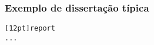 \begin{frame}
  \frametitle{Exemplo de dissertação típica}

  \begin{exemplo}
%    
%    
%    
%    
%    
%    
    \texttt{\blue{\string\documentclass}[12pt]\ac{}report\fc{}\\[1mm]
      ...\ \\[1mm]
      \\[1mm]
        \ \ \ \green{\string}\\[1mm]
        \ \ \ \green{\string}\\[1mm]
        \ \ \ \blue{\string\tableofcontents}\\[1mm]
        \ \ \ \green{\string}
        \ \ \ \ \ \ \ \ \ \ \\[1mm]
        \ \ \ \green{\string}
        \ \ \ \ \ \ \ \ \ \\[1mm]
        \ \ \ \green{\string}
        \ \ \ \ \ \\[1mm]
        \ \ \ \blue{\string}\\[1mm]
        \ \ \ \blue{\string}\\[1mm]
        }
  \end{exemplo}

\end{frame}


